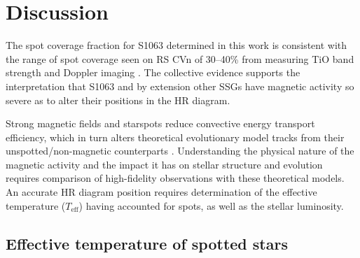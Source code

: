 \documentclass[trackchanges]{aastex631}
\begin{document}
\section{Discussion}
\label{sec:discussion}

The spot coverage fraction for S1063 determined in this work is consistent with the range of spot coverage seen on RS CVn of 30--40\% from measuring TiO band strength \citep{oneal96, oneal98, oneal04} and Doppler imaging \citep{hackman12}. The collective evidence supports the interpretation that S1063 and by extension other SSGs have magnetic activity so severe as to alter their positions in the HR diagram.

Strong magnetic fields and starspots reduce convective energy transport efficiency, which in turn alters theoretical evolutionary model tracks from their unspotted/non-magnetic counterparts \citep{2013ApJ...779..183F,somers15,somers15b,somers20}. Understanding the physical nature of the magnetic activity and the impact it has on stellar structure and evolution requires comparison of high-fidelity observations with these theoretical models.  An accurate HR diagram position requires determination of the effective temperature ($T_{\textrm{eff}}$) having accounted for spots, as well as the stellar luminosity.

\subsection{Effective temperature of spotted stars}
\end{document}
